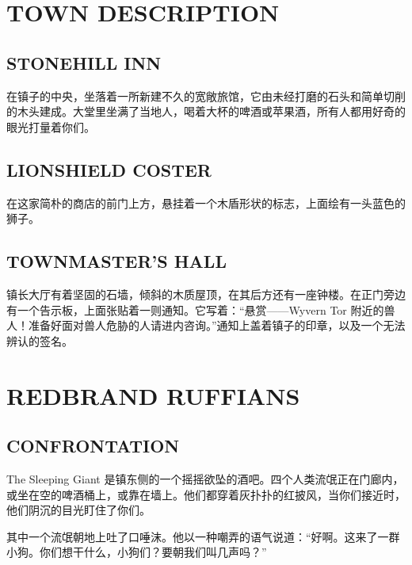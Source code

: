 \documentclass[letterpaper,twocolumn,openany,nodeprecatedcode]{dndbook}
\begin{document}
\section{TOWN DESCRIPTION}
\subsection{STONEHILL INN}
\begin{DndReadAloud}
  \begin{chinese}
    在镇子的中央，坐落着一所新建不久的宽敞旅馆，它由未经打磨的石头和简单切削的木头建成。大堂里坐满了当地人，喝着大杯的啤酒或苹果酒，所有人都用好奇的眼光打量着你们。
  \end{chinese}
\end{DndReadAloud}

\subsection{LIONSHIELD COSTER}
\begin{DndReadAloud}
  \begin{chinese}
    在这家简朴的商店的前门上方，悬挂着一个木盾形状的标志，上面绘有一头蓝色的狮子。
  \end{chinese}
\end{DndReadAloud}

\subsection{TOWNMASTER'S HALL}
\begin{DndReadAloud}
  \begin{chinese}
    镇长大厅有着坚固的石墙，倾斜的木质屋顶，在其后方还有一座钟楼。在正门旁边有一个告示板，上面张贴着一则通知。它写着：“悬赏——Wyvern Tor 附近的兽人！准备好面对兽人危胁的人请进内咨询。”通知上盖着镇子的印章，以及一个无法辨认的签名。
  \end{chinese}
\end{DndReadAloud}

\section{REDBRAND RUFFIANS}
\subsection{CONFRONTATION}
\begin{DndReadAloud}
  \begin{chinese}
    The Sleeping Giant 是镇东侧的一个摇摇欲坠的酒吧。四个人类流氓正在门廊内，或坐在空的啤酒桶上，或靠在墙上。他们都穿着灰扑扑的红披风，当你们接近时，他们阴沉的目光盯住了你们。

    其中一个流氓朝地上吐了口唾沫。他以一种嘲弄的语气说道：“好啊。这来了一群小狗。你们想干什么，小狗们？要朝我们叫几声吗？”
  \end{chinese}
\end{DndReadAloud}
\end{document}
